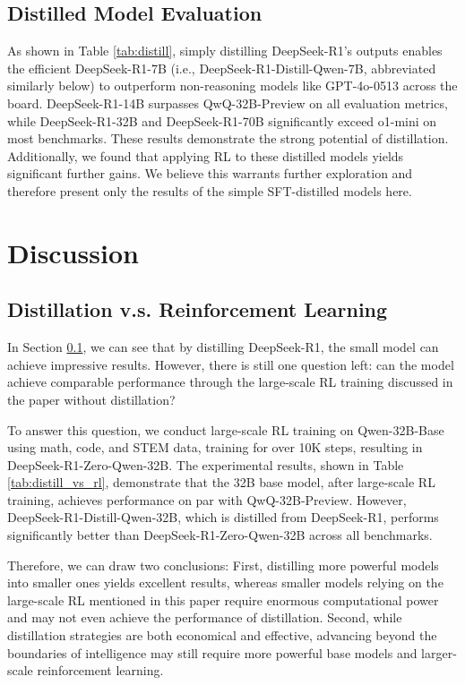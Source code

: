 \documentclass[11pt, a4paper, logo, copyright, nonumbering]{deepseek}
\begin{document}
{\subsection{Distilled Model Evaluation}
\label{sec:distilled_model_evaluation}


As shown in Table \ref{tab:distill}, simply distilling DeepSeek-R1's outputs enables the efficient DeepSeek-R1-7B (i.e., DeepSeek-R1-Distill-Qwen-7B, abbreviated similarly below) to outperform non-reasoning models like GPT-4o-0513 across the board.
DeepSeek-R1-14B surpasses QwQ-32B-Preview on all evaluation metrics, while DeepSeek-R1-32B and DeepSeek-R1-70B significantly exceed o1-mini on most benchmarks.
These results demonstrate the strong potential of distillation.
Additionally, we found that applying RL to these distilled models yields significant further gains. We believe this warrants further exploration and therefore present only the results of the simple SFT-distilled models here.


\section{Discussion}
\subsection{Distillation v.s. Reinforcement Learning}


In Section \ref{sec:distilled_model_evaluation}, we can see that by distilling DeepSeek-R1, the small model can achieve impressive results. However, there is still one question left: can the model achieve comparable performance through the large-scale RL training discussed in the paper without distillation?


To answer this question, we conduct large-scale RL training on Qwen-32B-Base using math, code, and STEM data, training for over 10K steps, resulting in DeepSeek-R1-Zero-Qwen-32B. The experimental results, shown in Table \ref{tab:distill_vs_rl}, demonstrate that the 32B base model, after large-scale RL training, achieves performance on par with QwQ-32B-Preview. However, DeepSeek-R1-Distill-Qwen-32B, which is distilled from DeepSeek-R1,  performs significantly better than DeepSeek-R1-Zero-Qwen-32B across all benchmarks.

Therefore, we can draw two conclusions: First, distilling more powerful models into smaller ones yields excellent results, whereas smaller models relying on the large-scale RL mentioned in this paper require enormous computational power and may not even achieve the performance of distillation. Second, while distillation strategies are both economical and effective, advancing beyond the boundaries of intelligence may still require more powerful base models and larger-scale reinforcement learning.

}
\end{document}
